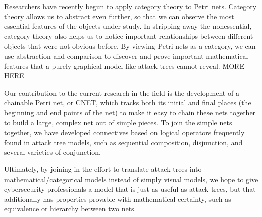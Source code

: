 \par Researchers have recently begun to apply category theory to Petri nets. Category theory allows us to abstract even further, so that we can observe the most essential features of the objects under study. In stripping away the nonessential, category theory also helps us to notice important relationships between different objects that were not obvious before. By viewing Petri nets as a category, we can use abstraction and comparison to discover and prove important mathematical features that a purely graphical model like attack trees cannot reveal. MORE HERE
\par Our contribution to the current research in the field is the development of a chainable Petri net, or CNET, which tracks both its initial and final places (the beginning and end points of the net) to make it easy to chain these nets together to build a large, complex net out of simple pieces. To join the simple nets together, we have developed connectives based on logical operators frequently found in attack tree models, such as sequential composition, disjunction, and several varieties of conjunction. 
\par Ultimately, by joining in the effort to translate attack trees into mathematical/categorical models instead of simply visual models, we  hope to give cybersecurity professionals a model that is just as useful as attack trees, but that additionally has properties provable with mathematical certainty, such as equivalence or hierarchy between two nets.
    
